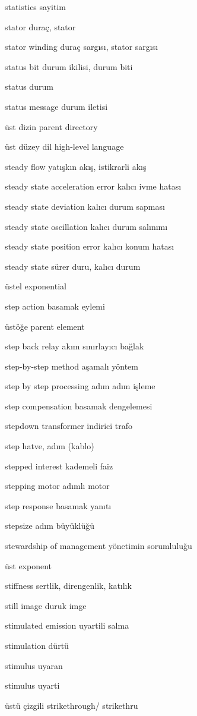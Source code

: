 \documentclass[12pt,fleqn]{article}\usepackage{../../common}
\begin{document}
statistics sayitim

stator duraç, stator

stator winding duraç sargısı, stator sargısı

status bit durum ikilisi, durum biti

status durum

status message durum iletisi

üst dizin parent directory

üst düzey dil high-level language

steady flow yatışkın akış, istikrarli akış

steady state acceleration error kalıcı ivme hatası

steady state deviation kalıcı durum sapması

steady state oscillation kalıcı durum salınımı

steady state position error kalıcı konum hatası

steady state sürer duru, kalıcı durum

üstel exponential

step action basamak eylemi

üstöğe parent element

step back relay akım sınırlayıcı bağlak

step-by-step method aşamalı yöntem

step by step processing adım adım işleme

step compensation basamak dengelemesi

stepdown transformer indirici trafo

step hatve, adım (kablo)

stepped interest kademeli faiz

stepping motor adımlı motor

step response basamak yanıtı

stepsize adım büyüklüğü

stewardship of management yönetimin sorumluluğu

üst exponent

stiffness sertlik, direngenlik, katılık

still image duruk imge

stimulated emission uyartili salma

stimulation dürtü

stimulus uyaran

stimulus uyarti

üstü çizgili strikethrough/ strikethru
\end{document}
